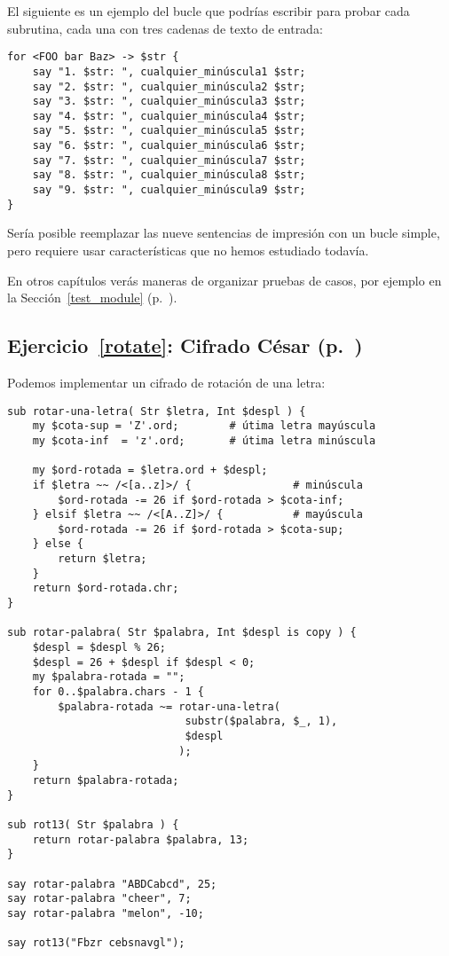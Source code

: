 El siguiente es un ejemplo del bucle que podrías escribir para probar
cada subrutina, cada una con tres cadenas de texto de entrada:
\begin{verbatim}
for <FOO bar Baz> -> $str {
    say "1. $str: ", cualquier_minúscula1 $str;
    say "2. $str: ", cualquier_minúscula2 $str;
    say "3. $str: ", cualquier_minúscula3 $str;
    say "4. $str: ", cualquier_minúscula4 $str;
    say "5. $str: ", cualquier_minúscula5 $str;
    say "6. $str: ", cualquier_minúscula6 $str;
    say "7. $str: ", cualquier_minúscula7 $str;
    say "8. $str: ", cualquier_minúscula8 $str;
    say "9. $str: ", cualquier_minúscula9 $str;
}
\end{verbatim}

Sería posible reemplazar las nueve sentencias de impresión 
con un bucle simple, pero requiere usar características que
no hemos estudiado todavía.

En otros capítulos verás maneras de organizar pruebas de casos, 
por ejemplo en la Sección~\ref{test_module} (p.~\pageref{test_module}).

\subsection{Ejercicio~\ref{rotate}: Cifrado César (p.~\pageref{rotate})}

\label{sol_rotate}

Podemos implementar un cifrado de rotación de una letra:

\begin{verbatim}
sub rotar-una-letra( Str $letra, Int $despl ) {
    my $cota-sup = 'Z'.ord;        # útima letra mayúscula
    my $cota-inf  = 'z'.ord;       # útima letra minúscula

    my $ord-rotada = $letra.ord + $despl;
    if $letra ~~ /<[a..z]>/ {                # minúscula
        $ord-rotada -= 26 if $ord-rotada > $cota-inf;
    } elsif $letra ~~ /<[A..Z]>/ {           # mayúscula
        $ord-rotada -= 26 if $ord-rotada > $cota-sup;
    } else {
        return $letra;
    }
    return $ord-rotada.chr;
}

sub rotar-palabra( Str $palabra, Int $despl is copy ) {
    $despl = $despl % 26;
    $despl = 26 + $despl if $despl < 0;
    my $palabra-rotada = "";
    for 0..$palabra.chars - 1 {
        $palabra-rotada ~= rotar-una-letra(
                            substr($palabra, $_, 1),
                            $despl
                           );
    }
    return $palabra-rotada;
}

sub rot13( Str $palabra ) {
    return rotar-palabra $palabra, 13;
} 

say rotar-palabra "ABDCabcd", 25;
say rotar-palabra "cheer", 7;
say rotar-palabra "melon", -10;

say rot13("Fbzr cebsnavgl");
\end{verbatim}

